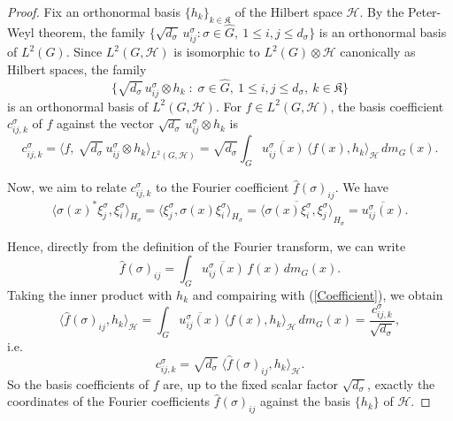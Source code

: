 \documentclass[10pt,a4paper]{amsart}
\begin{document}
\begin{proof}
Fix an orthonormal basis $\{h_k\}_{k\in \mathfrak{K}}$ of the Hilbert space $\mathcal{H}$. By the Peter-Weyl theorem,  the family $\{\sqrt{d_\sigma}\,u^\sigma_{ij} :
\sigma\in\widehat{G},\ 1\le i,j\le d_\sigma\}$ is an orthonormal basis of $L^2(G)$.  Since
$L^2(G,\mathcal{H})$ is isomorphic to $L^2(G)\otimes\mathcal{H}$ canonically as Hilbert spaces, the family
\[
\big\{\sqrt{d_\sigma}\,u^\sigma_{ij}\otimes h_k \;:\; \sigma\in\widehat{G},\ 1\le i,j\le
d_\sigma,\ k\in \mathfrak{K}\big\}
\]
is an orthonormal basis of $L^2(G,\mathcal{H})$. For $f\in  L^2(G,\mathcal{H})$,  the basis coefficient $c^\sigma_{ij,k}$ of $f$ against the vector $\sqrt{d_\sigma}\,u^\sigma_{ij}\otimes h_k$ is
\begin{equation}\label{Coefficient}
c^\sigma_{ij,k}=\big\langle f,\ \sqrt{d_\sigma}\,u^\sigma_{ij}\otimes h_k
\big\rangle_{L^2(G,\mathcal{H})}
=\sqrt{d_\sigma}\int_G \overline{u^\sigma_{ij}(x)}\,\big\langle f(x),h_k\big\rangle_\mathcal{H}
\,dm_G(x).
\end{equation}

Now, we aim to  relate $c^\sigma_{ij,k}$ to the Fourier coefficient $\widehat{f}(\sigma)_{ij}$.
We have
\[
\big\langle\sigma(x)^*\xi_j^\sigma,\xi_i^\sigma\big\rangle_{H_\sigma}
=\big\langle\xi_j^\sigma,\sigma(x)\xi_i^\sigma\big\rangle_{H_\sigma}
=\overline{\big\langle\sigma(x)\xi_i^\sigma,\xi_j^\sigma\big\rangle}_{H_\sigma}
=\overline{u^\sigma_{ij}(x)}.
\]

Hence, directly from the definition of the Fourier transform, we can write 
\[
\widehat f(\sigma)_{ij}
=\int_G\overline{u^\sigma_{ij}(x)}\,f(x)\,dm_G(x).
\]
Taking the inner product with $h_k$ and compairing with (\ref{Coefficient}), we obtain 
\[
\big\langle\widehat f(\sigma)_{ij},h_k\big\rangle_\mathcal{H}
=\int_G\overline{u^\sigma_{ij}(x)}\,\big\langle f(x),h_k\big\rangle_\mathcal{H}\,dm_G(x)
=\frac{c^\sigma_{ij,k}}{\sqrt{d_\sigma}},
\]
i.e.
\begin{equation}\label{CoefficientC}
c^\sigma_{ij,k}=\sqrt{d_\sigma}\;\big\langle \widehat f(\sigma)_{ij},h_k\big\rangle_\mathcal{H}.
\end{equation}
So the basis coefficients of $f$ are, up to the fixed scalar factor $\sqrt{d_\sigma}$,
exactly the coordinates of the Fourier coefficients $\widehat f(\sigma)_{ij}$ against the basis $\{h_k\}$ of $\mathcal{H}$.


\end{proof}
\end{document}
